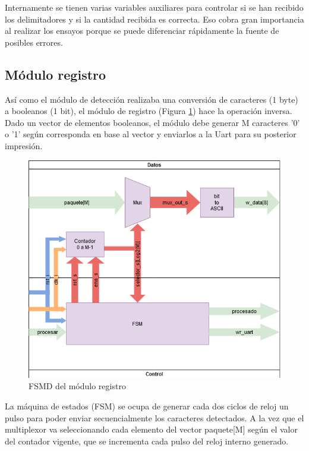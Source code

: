 		Internamente se tienen varias variables auxiliares para controlar si se han recibido los delimitadores y si la cantidad recibida es correcta. Eso cobra gran importancia al realizar los ensayos porque se puede diferenciar rápidamente la fuente de posibles errores.
		
	\subsection{Módulo registro}
	
		Así como el módulo de detección realizaba una conversión de caracteres (1 byte) a booleanos (1 bit), el módulo de registro (Figura \ref{fig:FSMD_Registro}) hace la operación inversa. Dado un vector de elementos booleanos, el módulo debe generar M caracteres '0' o '1' según corresponda en base al vector y enviarlos a la Uart para su posterior impresión.
		
		\begin{figure}[h]
		\centering
			\includegraphics[scale=.6]{./Figures/FSMD-Registro}
			\caption{FSMD del módulo registro}
			\label{fig:FSMD_Registro}
		\end{figure}

		\vspace{10cm}
		
		La máquina de estados (FSM) se ocupa de generar cada dos ciclos de reloj un pulso para poder enviar secuencialmente los caracteres detectados. A la vez que el multiplexor va seleccionando cada elemento del vector paquete[M] según el valor del contador vigente, que se incrementa cada pulso del reloj interno generado.
		
